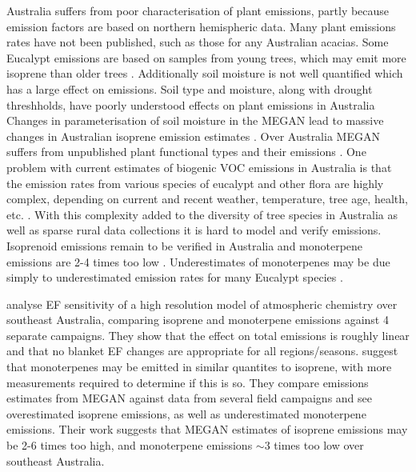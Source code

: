     
    Australia suffers from poor characterisation of plant emissions, partly because emission factors are based on northern hemispheric data.
    Many plant emissions rates have not been published, such as those for any Australian acacias.
    Some Eucalypt emissions are based on samples from young trees, which may emit more isoprene than older trees \parencite{Emmerson2016}.
    Additionally soil moisture is not well quantified which has a large effect on emissions.
    Soil type and moisture, along with drought threshholds, have poorly understood effects on plant emissions in Australia
    Changes in parameterisation of soil moisture in the MEGAN lead to massive changes in Australian isoprene emission estimates \parencite{Sindelarova2014}.
    Over Australia MEGAN suffers from unpublished plant functional types and their emissions \parencite[e.g. ]{Muller2008}.
    One problem with current estimates of biogenic VOC emissions in Australia is that the emission rates from various species of eucalypt and other flora are highly complex, depending on current and recent weather, temperature, tree age, health, etc. \parencite{Guenther2012}. 
    With this complexity added to the diversity of tree species in Australia as well as sparse rural data collections it is hard to model and verify emissions.
    Isoprenoid emissions remain to be verified in Australia and monoterpene emissions are 2-4 times too low \parencite{Winters2009,Emmerson2016}.
    Underestimates of monoterpenes may be due simply to underestimated emission rates for many Eucalypt species \parencite{Winters2009}.
       
    \textcite{Emmerson2016} analyse EF sensitivity of a high resolution model of atmospheric chemistry over southeast Australia, comparing isoprene and monoterpene emissions against 4 separate campaigns.
    They show that the effect on total emissions is roughly linear and that no blanket EF changes are appropriate for all regions/seasons.
    \textcite{Emmerson2016} suggest that monoterpenes may be emitted in similar quantites to isoprene, with more measurements required to determine if this is so.
    They compare emissions estimates from MEGAN against data from several field campaigns and see overestimated isoprene emissions, as well as underestimated monoterpene emissions.
    Their work suggests that MEGAN estimates of isoprene emissions may be 2-6 times too high, and monoterpene emissions $\sim3$ times too low over southeast Australia.
    
